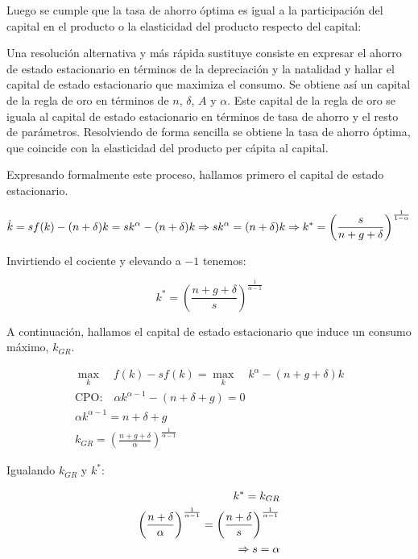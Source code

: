 \documentclass{nuevotema}
\begin{document}
Luego se cumple que la tasa de ahorro óptima es igual a la participación del capital en el producto o la elasticidad del producto respecto del capital:

\begin{center}
\end{center}

Una resolución alternativa y más rápida sustituye consiste en expresar el ahorro de estado estacionario en términos de la depreciación y la natalidad y hallar el capital de estado estacionario que maximiza el consumo. Se obtiene así un capital de la regla de oro en términos de $n$, $\delta$, $A$ y $\alpha$. Este capital de la regla de oro se iguala al capital de estado estacionario en términos de tasa de ahorro y el resto de parámetros. Resolviendo de forma sencilla se obtiene la tasa de ahorro óptima, que coincide con la elasticidad del producto per cápita al capital.

Expresando formalmente este proceso, hallamos primero el capital de estado estacionario.

\begin{equation*}
\dot{k} = sf(k) - (n+\delta) k = sk^\alpha - (n+\delta)k \Rightarrow sk^\alpha = (n+\delta)k \Rightarrow k^* = \left( \frac{s}{n+g+\delta} \right)^\frac{1}{1-\alpha}
\end{equation*}

Invirtiendo el cociente y elevando a $-1$ tenemos:

\begin{equation*}
k^* = \left( \frac{n+g+\delta}{s} \right)^{\frac{1}{\alpha -1}}
\end{equation*}

A continuación, hallamos el capital de estado estacionario que induce un consumo máximo, $k_{GR}$.

\begin{align*}
\underset{k}{\max} \quad f(k) - sf(k) = \underset{k}{\max} \quad {k}^\alpha - (n+g+\delta)k \\
\text{CPO:} \quad \alpha k^{\alpha - 1} - (n+\delta+g) = 0 \\
 \alpha k^{\alpha -1} = n+\delta+g \\
k_{GR} = \left(\frac{n+g+\delta}{\alpha } \right)^{\frac{1}{\alpha-1}}
\end{align*}

Igualando $k_{GR}$ y $k^*$:

\begin{align*}
k^* = k_{GR} \\
\left( \frac{n+\delta}{\alpha }  \right)^{\frac{1}{\alpha-1}} = \left( \frac{n+\delta}{s} \right)^{\frac{1}{\alpha -1}} \\
\Rightarrow s = \alpha
\end{align*}
\end{document}
